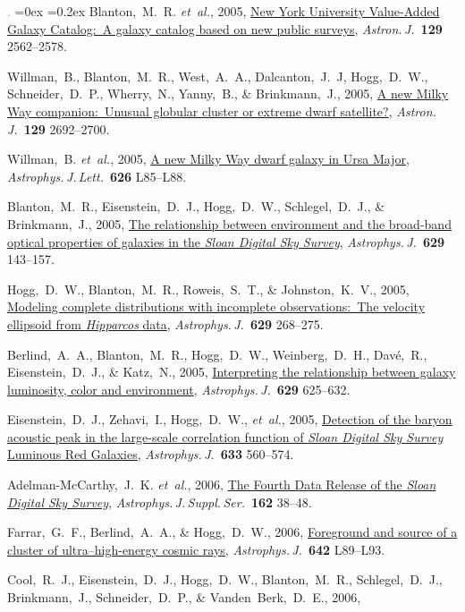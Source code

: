 \documentclass[12pt,letterpaper]{article}
\newcommand{\latin}[1]{\textsl{#1}}
\newcommand{\etal}{\latin{et~al.}}
\newcommand{\satellite}[1]{\textsl{#1}}
\newcommand{\project}[1]{\textsl{#1}}
\newcommand{\doi}[2]{\href{http://dx.doi.org/#1}{{#2}}}
\newcommand{\deemph}[1]{\textcolor{grey}{\footnotesize{#1}}}
\newcommand{\pubnumber}[1]{\deemph{{#1}.}}
\newcounter{refpubnum}
\newcommand{\hogglist}{%
    \rightmargin=0in
    \leftmargin=0.18in
    \topsep=0ex
    \partopsep=0pt
    \itemsep=0.2ex
    \parsep=0pt
    \itemindent=-1.0\leftmargin
    \listparindent=0.0\leftmargin
    \settowidth{\labelsep}{~}
    \usecounter{refpubnum}
  }
\begin{document}
\begin{list}{\pubnumber{\therefpubnum}}{\hogglist}
Blanton,~M.~R. \etal, 2005,
\doi{10.1086/429803}{New York University Value-Added Galaxy Catalog:\ A galaxy catalog based on new public surveys},
\textit{Astron.\,J.}\ \textbf{129} 2562--2578.
\item
Willman,~B., Blanton,~M.~R., West,~A.~A., Dalcanton,~J.~J, Hogg,~D.~W., Schneider,~D.~P., Wherry,~N., Yanny,~B., \& Brinkmann,~J., 2005,
\doi{10.1086/430214}{A new Milky Way companion:\ Unusual globular cluster or extreme dwarf satellite?},
\textit{Astron.\,J.}\ \textbf{129} 2692--2700.
\item\label{pub:Willman2005b}
Willman,~B. \etal, 2005,
\doi{10.1086/431760}{A new Milky Way dwarf galaxy in Ursa Major},
\textit{Astrophys.\,J.\,Lett.}\ \textbf{626} L85--L88.
\item
Blanton,~M.~R., Eisenstein,~D.~J., Hogg,~D.~W., Schlegel,~D.~J., \& Brinkmann,~J., 2005,
\doi{10.1086/422897}{The relationship between environment and the broad-band optical properties of galaxies in the \project{Sloan Digital Sky Survey}},
\textit{Astrophys.\,J.}\ \textbf{629} 143--157.
\item
Hogg,~D.~W., Blanton,~M.~R., Roweis,~S.~T., \& Johnston,~K.~V., 2005,
\doi{10.1086/431572}{Modeling complete distributions with incomplete observations:\ The velocity ellipsoid from \satellite{Hipparcos} data},
\textit{Astrophys.\,J.}\ \textbf{629} 268--275.
\item
Berlind,~A.~A., Blanton,~M.~R., Hogg,~D.~W., Weinberg,~D.~H., Dav\'e,~R., Eisenstein,~D.~J., \& Katz,~N., 2005,
\doi{10.1086/431658}{Interpreting the relationship between galaxy luminosity, color and environment},
\textit{Astrophys.\,J.}\ \textbf{629} 625--632.
\item\label{pub:Eisenstein2005}
Eisenstein,~D.~J., Zehavi,~I., Hogg,~D.~W., \etal, 2005,
\doi{10.1086/466512}{Detection of the baryon acoustic peak in the large-scale correlation function of \project{Sloan Digital Sky Survey} Luminous Red Galaxies},
\textit{Astrophys.\,J.}\ \textbf{633} 560--574.
\item
Adelman-McCarthy,~J.~K. \etal, 2006,
\doi{10.1086/497917}{The Fourth Data Release of the \project{Sloan Digital Sky Survey}},
\textit{Astrophys.\,J.\,Suppl.\,Ser.}\ \textbf{162} 38--48.
\item
Farrar,~G.~F., Berlind,~A.~A., \& Hogg,~D.~W., 2006,
\doi{10.1086/504711}{Foreground and source of a cluster of ultra--high-energy cosmic rays},
\textit{Astrophys.\,J.}\ \textbf{642} L89--L93.
\item
Cool,~R.~J., Eisenstein,~D.~J., Hogg,~D.~W., Blanton,~M.~R., Schlegel,~D.~J., Brinkmann,~J., Schneider,~D.~P., \& Vanden~Berk,~D.~E., 2006,

\end{list}
\end{document}
